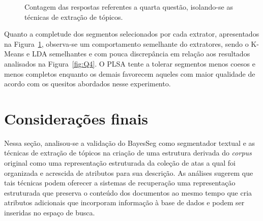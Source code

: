 \begin{figure}[!h] \centering     %


	\caption{Contagem das respostas referentes a quarta questão, isolando-se as técnicas de extração de tópicos.}
	\label{fig:influenciaExtSegQ4}
\end{figure}


Quanto a completude dos segmentos selecionados por cada extrator, apresentados na Figura~\ref{fig:influenciaExtSegQ4}, observa-se um comportamento semelhante do extratores, sendo o K-Means e LDA semelhantes e com pouca discrepância em relação aos resultados analisados na Figura~\ref{fig:Q4}. O PLSA tente a tolerar segmentos menos coesos e menos completos enquanto os demais favorecem aqueles com maior qualidade de acordo com os quesitos abordados nesse experimento.




\section{Considerações finais}

Nessa seção, analisou-se a validação do BayesSeg como segmentador textual e as técnicas de extração de tópicos na criação de uma estrutura derivada do \textit{corpus} original como uma representação estruturada da coleção de atas a qual foi organizada e acrescida de atributos para sua descrição. As análises sugerem que tais técnicas podem oferecer a sistemas de recuperação uma representação estruturada que preserva o conteúdo dos documentos ao mesmo tempo que cria atributos adicionais que incorporam informação à base de dados e podem ser inseridas no espaço de busca.  

